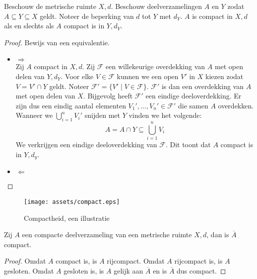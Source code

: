 \documentclass[main.tex]{subfiles}
\begin{document}
\begin{bpr}
  Beschouw de metrische ruimte $X,d$.
  Beschouw deelverzamelingen $A$ en $Y$ zodat $A \subseteq Y \subseteq X$ geldt.
  Noteer de beperking van $d$ tot $Y$ met $d_{Y}$.
  $A$ is compact in $X,d$ als en slechts als $A$ compact is in $Y,d_{Y}$.

  \begin{proof}
    Bewijs van een equivalentie.
    \begin{itemize}
    \item $\Rightarrow$\\
      Zij $A$ compact in $X,d$.
      Zij $\mathcal{F}$ een willekeurige overdekking van $A$ met open delen van $Y,d_{Y}$.
      Voor elke $V\in \mathcal{F}$ kunnen we een open $V'$ in $X$ kiezen zodat $V = V'\cap Y$ geldt.
      Noteer $\mathcal{F}' = \{ V' \mid V \in \mathcal{F}\}$.
      $\mathcal{F}'$ is dan een overdekking van $A$ met open delen van $X$.
      Bijgevolg heeft $\mathcal{F}'$ een eindige deeloverdekking.
      Er zijn dus een eindig aantal elementen $V_{1}',\dotsc,V_{n}' \in \mathcal{F}'$ die samen $A$ overdekken.
      Wanneer we $\bigcup_{i=1}^{n}V_{i}'$ snijden met $Y$ vinden we het volgende:
      \[ A = A \cap Y \subseteq \bigcup_{i=1}^{n}V_{i} \]
      We verkrijgen een eindige deeloverdekking van $\mathcal{F}$.
      Dit toont dat $A$ compact is in $Y,d_{y}$.
    \item $\Leftarrow$\\
    \end{itemize}
  \end{proof}
\end{bpr}

\begin{figure}[H]
  \centering
  \texttt{[image: assets/compact.eps]}
  \caption{Compactheid, een illustratie}
  \label{fig:compactheid}
\end{figure}

\begin{st}
  Zij $A$ een compacte deelverzameling van een metrische ruimte $X,d$, dan is $\overline{A}$ compact.
  
  \begin{proof}
    Omdat $A$ compact is, is $A$ rijcompact.
    Omdat $A$ rijcompact is, is $A$ gesloten.
    Omdat $A$ gesloten is, is $A$ gelijk aan $\overline{A}$ en is $\overline{A}$ dus compact.
  \end{proof}
\end{st}
\end{document}
